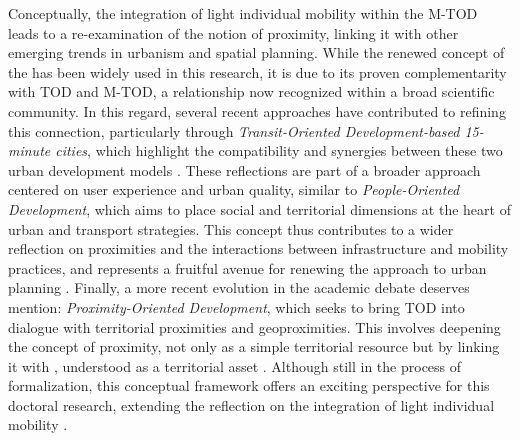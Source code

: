\begin{refsegment}
Conceptually, the integration of light individual mobility within the \acrshort{M-TOD} leads to a re-examination of the notion of proximity, linking it with other emerging trends in urbanism and spatial planning. While the renewed concept of the  has been widely used in this research, it is due to its proven complementarity with \acrshort{TOD} and \acrshort{M-TOD}, a relationship now recognized within a broad scientific community. In this regard, several recent approaches have contributed to refining this connection, particularly through \textsl{Transit-Oriented Development-based 15-minute cities}, which highlight the compatibility and synergies between these two urban development models \textcolor{blue}{\autocite[11]{wolanski_potential_2023}}. These reflections are part of a broader approach centered on user experience and urban quality, similar to \textsl{People-Oriented Development}, which aims to place social and territorial dimensions at the heart of urban and transport strategies. This concept thus contributes to a wider reflection on proximities and the interactions between infrastructure and mobility practices, and represents a fruitful avenue for renewing the approach to urban planning \textcolor{blue}{\autocite{davis_people_2024}}. Finally, a more recent evolution in the academic debate deserves mention: \textsl{Proximity-Oriented Development}, which seeks to bring \acrshort{TOD} into dialogue with territorial proximities and geoproximities. This involves deepening the concept of proximity, not only as a simple territorial resource but by linking it with , understood as a territorial asset \textcolor{blue}{\autocite{lebrun_proximite_2024}}. Although still in the process of formalization, this conceptual framework offers an exciting perspective for this doctoral research, extending the reflection on the integration of light individual mobility \textcolor{blue}{\autocite[3]{plastara_15-minute_2023}}.%


\end{refsegment}
